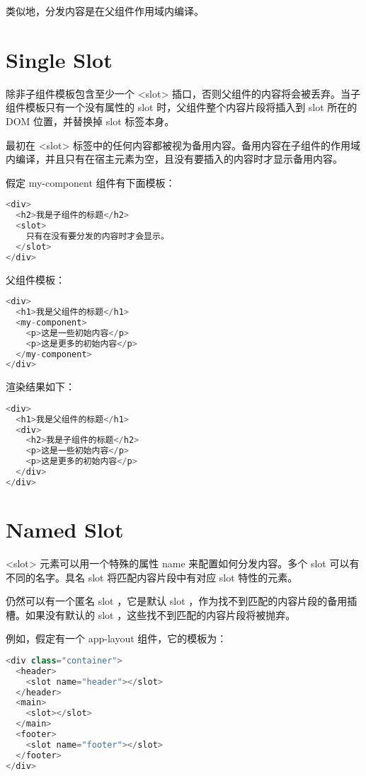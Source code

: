 类似地，分发内容是在父组件作用域内编译。


\section{Single Slot}


除非子组件模板包含至少一个 <slot> 插口，否则父组件的内容将会被丢弃。当子组件模板只有一个没有属性的 slot 时，父组件整个内容片段将插入到 slot 所在的 DOM 位置，并替换掉 slot 标签本身。

最初在 <slot> 标签中的任何内容都被视为备用内容。备用内容在子组件的作用域内编译，并且只有在宿主元素为空，且没有要插入的内容时才显示备用内容。

假定 my-component 组件有下面模板：

\begin{lstlisting}[language=JavaScript]
<div>
  <h2>我是子组件的标题</h2>
  <slot>
    只有在没有要分发的内容时才会显示。
  </slot>
</div>
\end{lstlisting}


父组件模板：


\begin{lstlisting}[language=JavaScript]
<div>
  <h1>我是父组件的标题</h1>
  <my-component>
    <p>这是一些初始内容</p>
    <p>这是更多的初始内容</p>
  </my-component>
</div>
\end{lstlisting}


渲染结果如下：


\begin{lstlisting}[language=JavaScript]
<div>
  <h1>我是父组件的标题</h1>
  <div>
    <h2>我是子组件的标题</h2>
    <p>这是一些初始内容</p>
    <p>这是更多的初始内容</p>
  </div>
</div>
\end{lstlisting}


\section{Named Slot}

<slot> 元素可以用一个特殊的属性 name 来配置如何分发内容。多个 slot 可以有不同的名字。具名 slot 将匹配内容片段中有对应 slot 特性的元素。

仍然可以有一个匿名 slot ，它是默认 slot ，作为找不到匹配的内容片段的备用插槽。如果没有默认的 slot ，这些找不到匹配的内容片段将被抛弃。

例如，假定有一个 app-layout 组件，它的模板为：

\begin{lstlisting}[language=JavaScript]
<div class="container">
  <header>
    <slot name="header"></slot>
  </header>
  <main>
    <slot></slot>
  </main>
  <footer>
    <slot name="footer"></slot>
  </footer>
</div>
\end{lstlisting}


